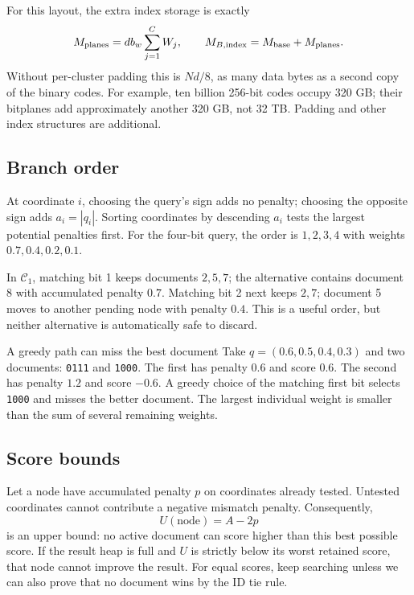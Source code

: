 For this layout, the extra index storage is exactly
\begin{equation}
M_{\rm planes}=d b_w\sum_{j=1}^{C}W_j,
\qquad M_{B,\rm index}=M_{\mathrm{base}}+M_{\rm planes}.
\label{eq:planes-storage}
\end{equation}
Without per-cluster padding this is $Nd/8$, as many data bytes as a second copy of the binary codes.
For example, ten billion 256-bit codes occupy 320 GB; their bitplanes add approximately
another 320 GB, not 32 TB. Padding and other index structures are additional.

\subsection{Branch order}
At coordinate $i$, choosing the query's sign adds no penalty; choosing the opposite sign adds
$a_i=|q_i|$. Sorting coordinates by descending $a_i$ tests the largest potential penalties first.
For the four-bit query, the order is $1,2,3,4$ with weights $0.7,0.4,0.2,0.1$.

In $\mathcal C_1$, matching bit 1 keeps documents $2,5,7$; the alternative contains document 8
with accumulated penalty $0.7$. Matching bit 2 next keeps $2,7$; document 5 moves to another
pending node with penalty $0.4$. This is a useful order, but neither alternative is automatically
safe to discard.

\begin{examplebox}{A greedy path can miss the best document}
Take $q=(0.6,0.5,0.4,0.3)$ and two documents: \texttt{0111} and \texttt{1000}.
The first has penalty $0.6$ and score $0.6$. The second has penalty $1.2$ and score $-0.6$.
A greedy choice of the matching first bit selects \texttt{1000} and misses the better document.
The largest individual weight is smaller than the sum of several remaining weights.
\end{examplebox}

\subsection{Score bounds}
Let a node have accumulated penalty $p$ on coordinates already tested. Untested coordinates
cannot contribute a negative mismatch penalty. Consequently,
\begin{equation}
U(\text{node})=A-2p
\label{eq:branch-bound}
\end{equation}
is an upper bound: no active document can score higher than this best possible score. If the result heap is full and
$U$ is strictly below its worst retained score, that node cannot improve the result.
For equal scores, keep searching unless we can also prove that no document wins by the ID tie rule.

